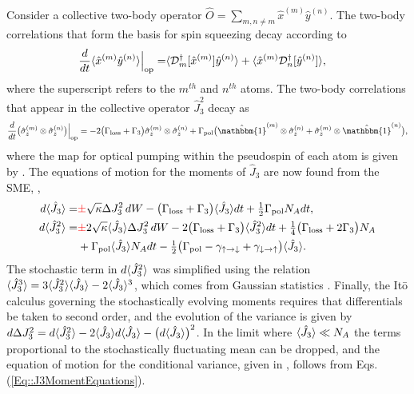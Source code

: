 \documentclass[preprint,aps,pra,onecolumn]{revtex4-1} %
\newcommand{\varz}{\Delta J_3^2}
\newcommand{\jz}{\hat{J}_3}
\newcommand{\gammaud}{\gamma_{\uparrow \rightarrow \downarrow}}
\newcommand{\gammadu}{\gamma_{\downarrow \rightarrow \uparrow}}
\newcommand{\lrate}{\Gamma_{\rm loss}}
\newcommand{\prate}{\Gamma_{\rm pol}}
\newcommand{\zrateA}{\tilde{\Gamma}}
\newcommand{\zrateB}{\Gamma_{?}}
\newcommand{\zrate}{\Gamma_{3}}
\newcommand{\error}[1]{{\color{red} #1}}
\begin{document}
\begin{appendix}
Consider a collective two-body operator $\hat{O} = \sum_{m, n \neq m} \hat{x}^{(m)} \hat{y}^{(n)}$. The two-body correlations that form the basis for spin squeezing decay according to \cite{baragiola_three-dimensional_2014}
	\begin{align}
		\frac{d}{dt} \langle{ \hat{x}^{(m)} \hat{y}^{(n)} }\rangle \Big|_{\rm op}= &\langle{ \mathcal{D}_m^\dagger[ \hat{x}^{(m)}] \hat{y}^{(n)} }\rangle + \langle{ \hat{x}^{(m)} \mathcal{D}_n^\dagger[ \hat{y}^{(n)}] }\rangle,
	\end{align}
where the superscript refers to the $m^{th}$ and $n^{th}$ atoms. The two-body correlations that appear in the collective operator $\jz^2$ decay as
	\begin{align}
		\frac{d}{dt} \big(\hat{\sigma}_z^{(m)} \otimes \hat{\sigma}_z^{(n)} \big)  \Big|_{\rm op} = - 2 \big( \lrate + \zrate \big)  \hat{\sigma}_z^{(m)} \otimes \hat{\sigma}_z^{(n)} + \prate \big(\hat{\mathbbm{1}}^{(m)} \otimes \hat{\sigma}_z^{(n)} + \hat{\sigma}_z^{(m)} \otimes \hat{\mathbbm{1}}^{(n)}\big),
	\end{align}
where the map for optical pumping within the pseudospin of each atom is given by .  The equations of motion for the moments of $\jz$ are now found from the SME, , 
	\begin{subequations} \label{Eq::J3MomentEquations}
	\begin{align} 
		d \expt{\jz} =& \error{\pm} \sqrt{\kappa} \varz \, dW - \big( \lrate + \zrate \big) \expt{\jz}dt + \smallfrac{1}{2} \prate N_A dt ,  \\
		d \expt{\jz^2} %
		=& \error{\pm} 2\sqrt{\kappa} \expt{\jz}\Delta J_3^2 \, dW - 2 \big( \lrate + \zrate \big) \expt{\jz^2}dt + \smallfrac{1}{4} \big( \lrate + 2\zrate \big) N_A  \\
		&+ \prate \expt{\jz} N_A dt - \smallfrac{1}{2} \big( \prate - \gammaud + \gammadu \big)\expt{\jz}. \nonumber 
	\end{align}
	\end{subequations}
The stochastic term in $d\expt{\jz^2}$ was simplified using the relation $\expt{\jz^3} = 3\expt{\jz^2}\expt{\jz}- 2\expt{\jz}^3$, which comes from Gaussian statistics \cite{jacobs_straightforward_2006}. Finally, the It\={o} calculus governing the stochastically evolving moments requires that differentials be taken to second order, and the evolution of the variance is given by $d \varz = d \expt{\jz^2} - 2 \expt{\jz} d \expt{\jz} - \big( d \expt{\jz} \big)^2$. In the limit where $\expt{\jz}\ll N_A$ the terms proportional to the stochastically fluctuating mean can be dropped, and the equation of motion for the conditional variance, given in , follows from Eqs. (\ref{Eq::J3MomentEquations}).



\end{appendix}
\end{document}
